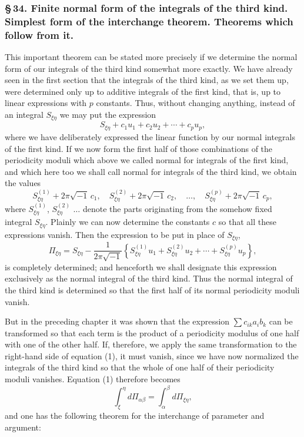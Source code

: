 \documentclass[10pt]{article}
\begin{document}
\subsubsection*{\S\,34. Finite normal form of the integrals of the third kind. Simplest form of the interchange theorem. Theorems which follow from it.}

This important theorem can be stated more precisely if we determine the normal form of our integrals of the third kind somewhat more exactly. We have already seen in the first section that the integrals of the third kind, as we set them up, were determined only up to additive integrals of the first kind, that is, up to linear expressions with \(p\) constants. Thus, without changing anything, instead of an integral \(S_{\xi\eta}\) we may put the expression
\[
S_{\xi\eta}+c_1u_1+c_2u_2+\cdots+c_pu_p,
\]
where we have deliberately expressed the linear function by our normal integrals of the first kind. If we now form the first half of those combinations of the periodicity moduli which above we called normal for integrals of the first kind, and which here too we shall call normal for integrals of the third kind, we obtain the values
\[
S_{\xi\eta}^{(1)}+2\pi\sqrt{-1}\,c_1,\quad
S_{\xi\eta}^{(2)}+2\pi\sqrt{-1}\,c_2,\quad\ldots,\quad
S_{\xi\eta}^{(p)}+2\pi\sqrt{-1}\,c_p,
\]
where \(S_{\xi\eta}^{(1)}\), \(S_{\xi\eta}^{(2)}\) \(\ldots\) denote the parts originating from the somehow fixed integral \(S_{\xi\eta}\). Plainly we can now determine the constants \(c\) so that all these expressions vanish. Then the expression to be put in place of \(S_{\xi\eta}\),
\[
\tag{2}
\Pi_{\xi\eta}=S_{\xi\eta}-\frac{1}{2\pi\sqrt{-1}}\left\{S_{\xi\eta}^{(1)}u_1+S_{\xi\eta}^{(2)}u_2+\cdots+S_{\xi\eta}^{(p)}u_p\right\},
\]
is completely determined; and henceforth we shall designate this expression exclusively as the normal integral of the third kind. Thus the normal integral of the third kind is determined so that the first half of its normal periodicity moduli vanish.

But in the preceding chapter it was shown that the expression \(\sum c_{ik}a_ib_k\) can be transformed so that each term is the product of a periodicity modulus of one half with one of the other half. If, therefore, we apply the same transformation to the right-hand side of equation (1), it must vanish, since we have now normalized the integrals of the third kind so that the whole of one half of their periodicity moduli vanishes. Equation (1) therefore becomes
\[
\tag{3}
\int_{\xi}^{\eta}d\Pi_{\alpha\beta}=\int_{\alpha}^{\beta}d\Pi_{\xi\eta},
\]
and one has the following theorem for the interchange of parameter and argument:
\end{document}
